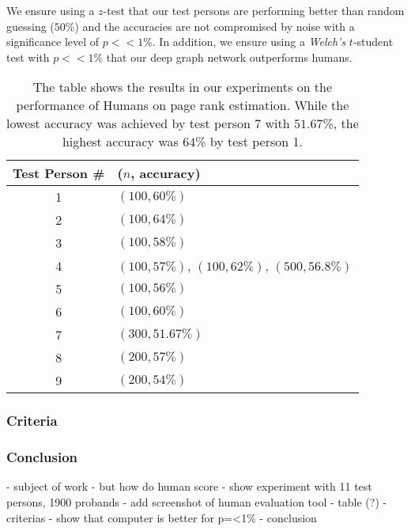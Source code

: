 We ensure using a $z$-test that our test persons are performing better than random guessing ($50$\%) and the accuracies are not compromised by noise with a significance level of $p << 1$\%. In addition, we ensure using a \textit{Welch's} $t$-student test with $p << 1$\% that our deep graph network outperforms humans.

\begin{table}[]
	\center
	\begin{tabular}{c||l}
		Test Person \#  & ($n$, accuracy)\\ \hline \hline
		1 &  $(100, 60\%)$ \\ \hline
		2 &  $(100, 64\%)$\\ \hline
		3 &  $(100, 58\%)$\\ \hline
		4 &  $(100, 57\%)$, $(100, 62\%)$, $(500, 56.8\%)$\\ \hline
		5 &  $(100, 56\%)$\\ \hline
		6 &  $(100, 60\%)$\\ \hline
		7 &  $(300, 51.67\%)$\\ \hline
		8 &  $(200, 57\%)$\\ \hline
		9 &  $(200, 54\%)$\\
	\end{tabular}
	\caption[Results of Human Performance on Page Rank Estimation]{The table shows the results in our experiments on the performance of Humans on page rank estimation. While the lowest accuracy was achieved by test person 7 with $51.67$\%, the highest accuracy was $64$\% by test person 1.}
\label{table_human_eval_results}
\end{table}

\subsubsection{Criteria}

\subsubsection{Conclusion}



- subject of work
- but how do human score
- show experiment with 11 test persons, 1900 probands 
- add screenshot of human evaluation tool
- table (?)
- criterias
- show that computer is better for p=<1\% 
- conclusion 